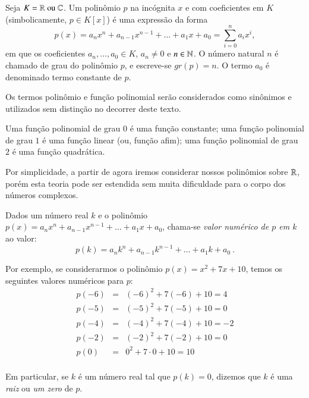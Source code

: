   \vskip0.3cm
 \colorbox{azul}{
 \begin{minipage}{0.9\linewidth}
 \begin{center}
  Seja $K= \mathbb{R} \text{ ou } \mathbb{C}$. Um polinômio $p$ na incógnita $x$ e com coeficientes em $K$ (simbolicamente, $p \in K[x]$) é uma expressão da forma
  \[p(x)= a_nx^n + a_{n-1}x^{n-1}+ \ldots + a_1x+ a_0= \sum_{i=0}^{n} a_ix^i ,\]
  em que os coeficientes $a_n, \ldots, a_0 \in K$, $a_n \neq 0$ e $n \in \mathbb{N}$. O número natural $n$ é chamado de grau do polinômio $p$, e escreve-se $gr(p)= n$. O termo $a_0$ é denominado termo constante de $p$.
 \end{center}
 \end{minipage}}
 \vskip0.3cm
 
 \begin{obs}
 Os termos polinômio e função polinomial serão considerados como sinônimos e utilizados sem distinção no decorrer deste texto.
 \end{obs}
 
 Uma função polinomial de grau $0$ é uma função constante; uma função polinomial de grau $1$ é uma função linear (ou, função afim); uma função polinomial de grau $2$ é uma função quadrática.
 
 Por simplicidade, a partir de agora iremos considerar nossos polinômios sobre $\mathbb{R}$, porém esta teoria pode ser estendida sem muita dificuldade para o corpo dos números complexos.
 
 \begin{defi}
 Dados um número real $k$ e o polinômio $p(x)= a_nx^n + a_{n-1}x^{n-1}+ \ldots + a_1x+ a_0$, chama-se \emph{valor numérico de $p$ em $k$} ao valor:
 \[p(k)= a_nk^n + a_{n-1}k^{n-1}+ \ldots + a_1k+ a_0 \ .\]
 \end{defi}
 
\begin{exem}
Por exemplo, se considerarmos o polinômio $p(x)= x^2 + 7x+10$, temos os seguintes valores numéricos para $p$:
\begin{eqnarray*}
p(-6)&=& (-6)^2 + 7(-6) +10= 4\\
p(-5)&=& (-5)^2 + 7(-5) +10= 0\\
p(-4)&=& (-4)^2 + 7(-4) +10= -2\\
p(-2)&=& (-2)^2 + 7(-2) +10= 0\\
p(0)&=& 0^2 + 7 \cdot 0 +10= 10\\
\end{eqnarray*}
\end{exem} 
 
 \begin{defi}
 Em particular, se $k$ é um número real tal que $p(k)= 0$, dizemos que $k$ é uma \emph{raiz} ou \emph{um zero} de $p$.
 \end{defi}
 
